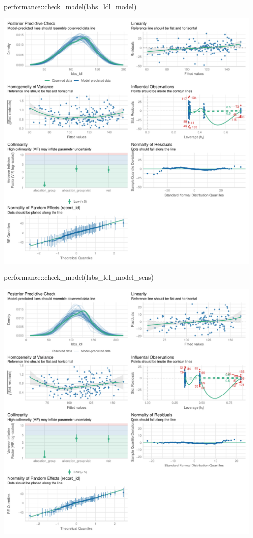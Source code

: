 \documentclass[
  12pt,
]{article}
\newenvironment{Shaded}{\begin{snugshade}}{\end{snugshade}}
\newcommand{\FunctionTok}[1]{\textcolor[rgb]{0.28,0.35,0.67}{#1}}
\newcommand{\NormalTok}[1]{\textcolor[rgb]{0.00,0.23,0.31}{#1}}
\newcommand{\SpecialCharTok}[1]{\textcolor[rgb]{0.37,0.37,0.37}{#1}}
\begin{document}
\begin{Shaded}
\begin{Highlighting}[]
\NormalTok{performance}\SpecialCharTok{::}\FunctionTok{check\_model}\NormalTok{(labs\_ldl\_model)}
\end{Highlighting}
\end{Shaded}

\includegraphics{Outcomes_files/figure-pdf/labs_ldl_4-1.pdf}

\begin{Shaded}
\begin{Highlighting}[]
\NormalTok{performance}\SpecialCharTok{::}\FunctionTok{check\_model}\NormalTok{(labs\_ldl\_model\_sens)}
\end{Highlighting}
\end{Shaded}

\includegraphics{Outcomes_files/figure-pdf/labs_ldl_4-2.pdf}
\end{document}
